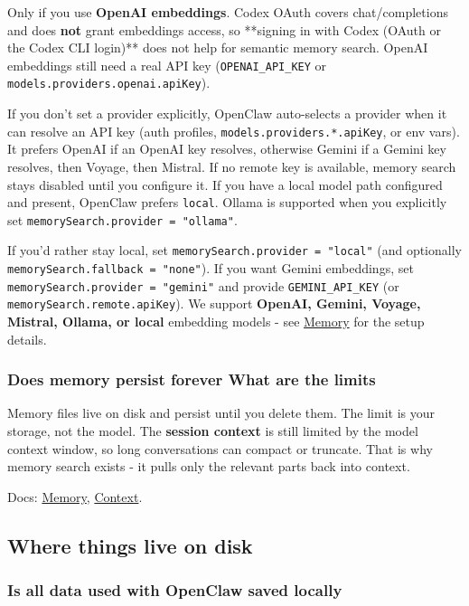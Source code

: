 Only if you use \textbf{OpenAI embeddings}. Codex OAuth covers chat/completions and
does \textbf{not} grant embeddings access, so **signing in with Codex (OAuth or the
Codex CLI login)** does not help for semantic memory search. OpenAI embeddings
still need a real API key (\texttt{OPENAI\_API\_KEY} or \texttt{models.providers.openai.apiKey}).

If you don't set a provider explicitly, OpenClaw auto-selects a provider when it
can resolve an API key (auth profiles, \texttt{models.providers.*.apiKey}, or env vars).
It prefers OpenAI if an OpenAI key resolves, otherwise Gemini if a Gemini key
resolves, then Voyage, then Mistral. If no remote key is available, memory
search stays disabled until you configure it. If you have a local model path
configured and present, OpenClaw
prefers \texttt{local}. Ollama is supported when you explicitly set
\texttt{memorySearch.provider = "ollama"}.

If you'd rather stay local, set \texttt{memorySearch.provider = "local"} (and optionally
\texttt{memorySearch.fallback = "none"}). If you want Gemini embeddings, set
\texttt{memorySearch.provider = "gemini"} and provide \texttt{GEMINI\_API\_KEY} (or
\texttt{memorySearch.remote.apiKey}). We support \textbf{OpenAI, Gemini, Voyage, Mistral, Ollama, or local} embedding
models - see \href{/concepts/memory}{Memory} for the setup details.

\subsubsection{Does memory persist forever What are the limits}


Memory files live on disk and persist until you delete them. The limit is your
storage, not the model. The \textbf{session context} is still limited by the model
context window, so long conversations can compact or truncate. That is why
memory search exists - it pulls only the relevant parts back into context.

Docs: \href{/concepts/memory}{Memory}, \href{/concepts/context}{Context}.

\subsection{Where things live on disk}


\subsubsection{Is all data used with OpenClaw saved locally}


